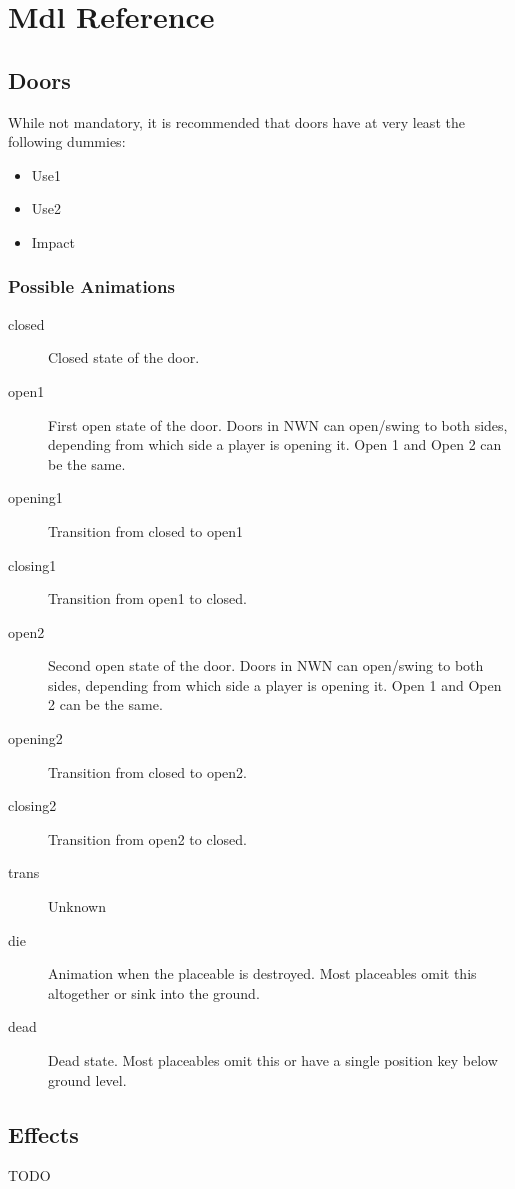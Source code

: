 \chapter{Mdl Reference}

\section{Doors}
While not mandatory, it is recommended that doors have at very least the
following dummies:
\begin{itemize}
\item Use1
\item Use2
\item Impact
\end{itemize}

\subsection*{Possible Animations}
\begin{description}
    \item[closed] Closed state of the door.
    \item[open1] First open state of the door. Doors in NWN can open/swing to both sides, depending from which side a player is opening it. Open 1 and Open 2 can be the same.
    \item[opening1] Transition from closed to open1
    \item[closing1] Transition from open1 to closed.
    \item[open2] Second open state of the door. Doors in NWN can open/swing to both sides, depending from which side a player is opening it. Open 1 and Open 2 can be the same.
    \item[opening2] Transition from closed to open2.
    \item[closing2] Transition from open2 to closed.
    \item[trans] Unknown
    \item[die] Animation when the placeable is destroyed. Most placeables omit this altogether or sink into the ground.
    \item[dead] Dead state. Most placeables omit this or have a single position key below ground level.
\end{description}

\section{Effects}
TODO


